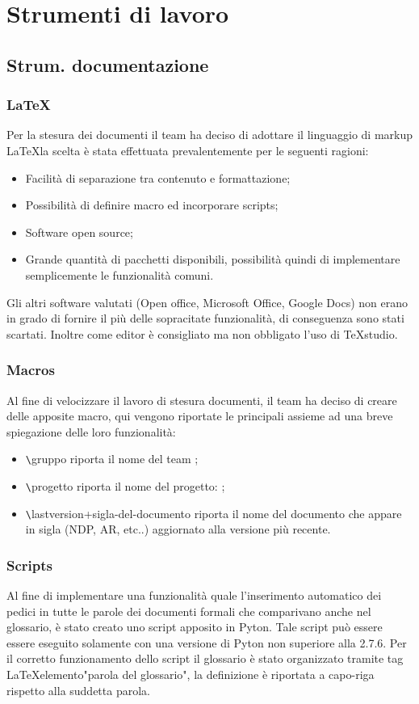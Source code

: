 \section{Strumenti di lavoro}
\subsection{Strum. documentazione}
\subsubsection{LaTeX}
Per la stesura dei documenti il team \gruppo{} ha deciso di adottare il linguaggio di markup \LaTeX la scelta è stata effettuata prevalentemente per le seguenti ragioni:
\begin{itemize}
\item Facilità di separazione tra contenuto
e formattazione;
\item Possibilità di definire macro ed incorporare scripts;
\item Software open source;
\item Grande quantità di pacchetti disponibili, possibilità quindi di implementare semplicemente le funzionalità comuni.
\end{itemize}
Gli altri software valutati (Open office, Microsoft Office, Google Docs) non erano in grado di fornire il più delle sopracitate funzionalità, di conseguenza sono stati scartati. Inoltre come editor è consigliato ma non obbligato l'uso di TeXstudio.

\subsubsection{Macros}
Al fine di velocizzare il lavoro di stesura documenti, il team \gruppo{} ha deciso di creare delle apposite macro, qui vengono riportate le principali assieme ad una breve spiegazione delle loro funzionalità:
\begin{itemize}
\item \verb+\+gruppo riporta il nome del team \gruppo;
\item \verb+\+progetto riporta il nome del progetto: \progetto;
\item \verb+\+lastversion+sigla-del-documento riporta il nome del documento che appare in sigla (NDP, AR, etc..) aggiornato alla versione più recente.

\end{itemize}
\subsubsection{Scripts}
Al fine di implementare una funzionalità quale l'inserimento automatico dei pedici in tutte le parole dei documenti formali che comparivano anche nel glossario, è stato creato uno script apposito in Pyton. Tale script può essere essere eseguito solamente con una versione di Pyton non superiore alla 2.7.6.
Per il corretto funzionamento dello script il glossario è stato organizzato tramite tag \LaTeX elemento{"parola del glossario"}, la definizione è riportata a capo-riga rispetto alla suddetta parola. 

